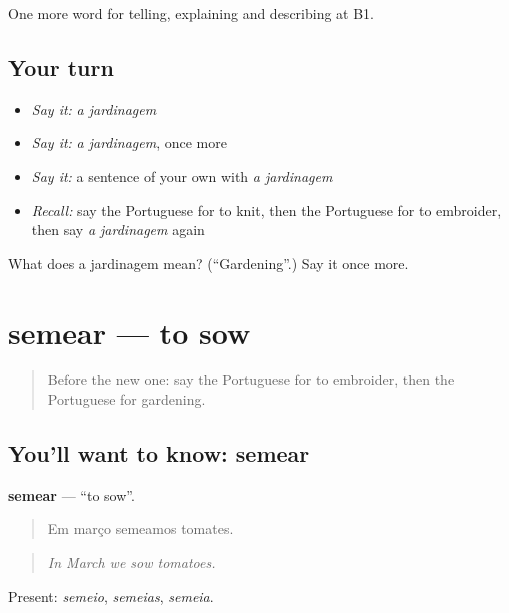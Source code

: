 \begin{grammarlens}[title={What you've built}]
One more word for telling, explaining and describing at B1.
\end{grammarlens}

\subsection*{Your turn}
\begin{itemize}
\raggedright
  \item \emph{Say it:} \emph{a jardinagem}
  \item \emph{Say it:} \emph{a jardinagem}, once more
  \item \emph{Say it:} a sentence of your own with \emph{a jardinagem}
  \item \emph{Recall:} say the Portuguese for to knit, then the Portuguese for to embroider, then say \emph{a jardinagem} again
\end{itemize}

\begin{tcolorbox}[breakable,colback=teal!4,colframe=teal!35!black,title={Before you move on}]
What does a jardinagem mean? (\textquotedblleft{}Gardening\textquotedblright{}.) Say it once more.
\end{tcolorbox}
\section[semear]{semear — to sow}

\label{lesson:PT-C501-semear}



\begin{quote}
Before the new one: say the Portuguese for to embroider, then the Portuguese for gardening.
\end{quote}

\subsection*{You'll want to know: semear}
\textbf{semear} — \textquotedblleft{}to sow\textquotedblright{}.

\begin{quote}
Em março semeamos tomates.
\end{quote}

\begin{quote}
\emph{In March we sow tomatoes.}
\end{quote}

Present: \emph{semeio}, \emph{semeias}, \emph{semeia}.

